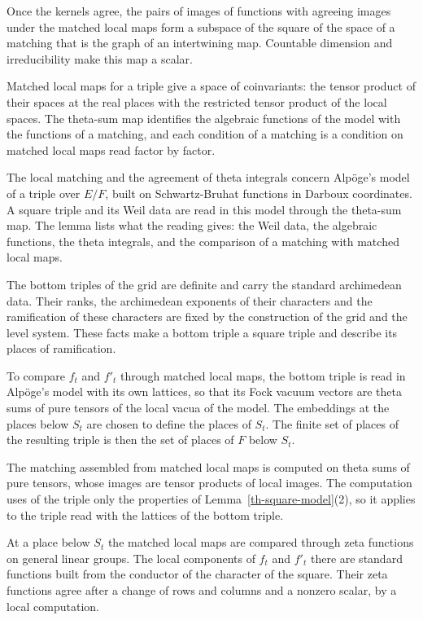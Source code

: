 Once the kernels agree, the pairs of images of functions with agreeing images
under the matched local maps form a subspace of the square of the space of a
matching that is the graph of an intertwining map. Countable dimension and
irreducibility make this map a scalar.

Matched local maps for a triple give a space of coinvariants: the tensor
product of their spaces at the real places with the restricted tensor product
of the local spaces. The theta-sum map identifies the algebraic functions of
the model with the functions of a matching, and each condition of a matching
is a condition on matched local maps read factor by factor.

The local matching and the agreement of theta integrals concern Alpöge's model
of a triple over $E/F$, built on Schwartz-Bruhat functions in Darboux
coordinates. A square triple and its Weil data are read in this model through
the theta-sum map. The lemma lists what the reading gives: the Weil data, the
algebraic functions, the theta integrals, and the comparison of a matching
with matched local maps.

The bottom triples of the grid are definite and carry the standard archimedean
data. Their ranks, the archimedean exponents of their characters and the
ramification of these characters are fixed by the construction of the grid and
the level system. These facts make a bottom triple a square triple and
describe its places of ramification.

To compare $f_t$ and $f'_t$ through matched local maps, the bottom triple is
read in Alpöge's model with its own lattices, so that its Fock vacuum vectors
are theta sums of pure tensors of the local vacua of the model. The embeddings at the
places below $S_t$ are chosen to define the places of $S_t$. The finite set of
places of the resulting triple is then the set of places of $F$ below $S_t$.

The matching assembled from matched local maps is computed on theta sums of
pure tensors, whose images are tensor products of local images. The
computation uses of the triple only the properties of
Lemma~\ref{th-square-model}(2), so it applies to the triple read with the
lattices of the bottom triple.

At a place below $S_t$ the matched local maps are compared through zeta
functions on general linear groups. The local components of $f_t$ and $f'_t$
there are standard functions built from the conductor of the character of the
square. Their zeta functions agree after a change of rows and columns and a
nonzero scalar, by a local computation.

